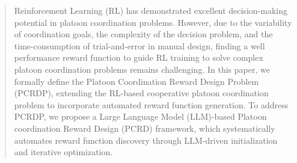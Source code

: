 \documentclass[lettersize,journal]{IEEEtran}
\begin{document}
\begin{abstract}
Reinforcement Learning (RL) has demonstrated excellent decision-making potential in platoon coordination problems.
However, due to the variability of coordination goals, the complexity of the decision problem, and the time-consumption of trial-and-error in manual design, finding a well performance
reward function to guide RL training to solve complex platoon coordination problems remains challenging.
In this paper, we formally define the Platoon Coordination Reward Design Problem (PCRDP),  extending the RL-based cooperative platoon coordination problem to incorporate automated reward function generation. 
To address PCRDP, we propose a Large Language Model (LLM)-based Platoon coordination Reward Design (PCRD) framework, which systematically automates reward function discovery through LLM-driven initialization and iterative optimization.

\end{abstract}
\end{document}
